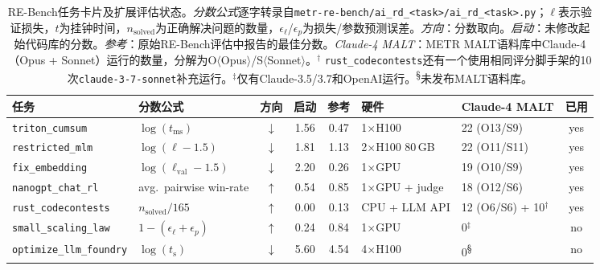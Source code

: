 \documentclass[
]{article}
\theoremstyle{definition}
\begin{document}
\begin{table}[h]
\centering
\small
\setlength{\tabcolsep}{4pt}
\begin{tabular}{l l c c c l l c}
\toprule
\textbf{任务} & \textbf{分数公式} & \textbf{方向} & \textbf{启动} & \textbf{参考} & \textbf{硬件} & \textbf{Claude-4 MALT} & \textbf{已用} \\
\midrule
\texttt{triton\_cumsum}         & $\log(t_\text{ms})$                & $\downarrow$ & 1.56 & 0.47 & 1$\times$H100        & 22 (O13/S9)        & yes \\
\texttt{restricted\_mlm}        & $\log(\ell{-}1.5)$                 & $\downarrow$ & 1.81 & 1.13 & 2$\times$H100 80\,GB & 22 (O11/S11)       & yes \\
\texttt{fix\_embedding}         & $\log(\ell_\text{val}{-}1.5)$      & $\downarrow$ & 2.20 & 0.26 & 1$\times$GPU         & 19 (O10/S9)        & yes \\
\texttt{nanogpt\_chat\_rl}      & avg.\ pairwise win-rate            & $\uparrow$   & 0.54 & 0.85 & 1$\times$GPU + judge & 18 (O12/S6)        & yes \\
\texttt{rust\_codecontests}     & $n_\text{solved}/165$              & $\uparrow$   & 0.00 & 0.13 & CPU + LLM API        & 12 (O6/S6) + 10$^\dagger$ & yes \\
\midrule
\texttt{small\_scaling\_law}    & $1{-}(\epsilon_\ell{+}\epsilon_p)$ & $\uparrow$   & 0.24 & 0.84 & 1$\times$GPU         & 0$^\ddagger$       & no \\
\texttt{optimize\_llm\_foundry} & $\log(t_\text{s})$                 & $\downarrow$ & 5.60 & 4.54 & 4$\times$H100        & 0\textsuperscript{\S}             & no \\
\bottomrule
\end{tabular}
\caption{RE-Bench任务卡片及扩展评估状态。\emph{分数公式}逐字转录自\texttt{metr-re-bench/ai\_rd\_<task>/ai\_rd\_<task>.py}；$\ell$表示验证损失，$t$为挂钟时间，$n_\text{solved}$为正确解决问题的数量，$\epsilon_\ell$/$\epsilon_p$为损失/参数预测误差。\emph{方向}：分数取向。\emph{启动}：未修改起始代码库的分数。\emph{参考}：原始RE-Bench评估中报告的最佳分数。\emph{Claude-4 MALT}：METR MALT语料库中Claude-4（Opus + Sonnet）运行的数量，分解为O$\langle$Opus$\rangle$/S$\langle$Sonnet$\rangle$。$^\dagger$ \texttt{rust\_codecontests}还有一个使用相同评分脚手架的10次\texttt{claude-3-7-sonnet}补充运行。$^\ddagger$仅有Claude-3.5/3.7和OpenAI运行。\textsuperscript{\S}未发布MALT语料库。}
\label{tab-extension-task-card}
\end{table}
\end{document}
